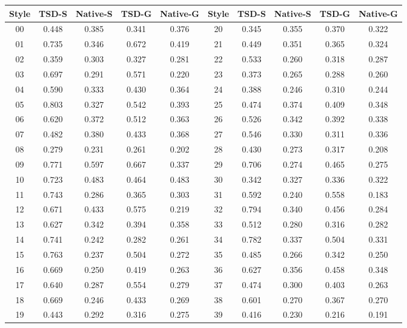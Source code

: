 \begin{tabular}{ccccc@{\hspace{14pt}}ccccc}
\toprule
Style & TSD-S & Native-S & TSD-G & Native-G & Style & TSD-S & Native-S & TSD-G & Native-G \\
\midrule
00 & 0.448 & 0.385 & 0.341 & 0.376 & 20 & 0.345 & 0.355 & 0.370 & 0.322 \\
01 & 0.735 & 0.346 & 0.672 & 0.419 & 21 & 0.449 & 0.351 & 0.365 & 0.324 \\
02 & 0.359 & 0.303 & 0.327 & 0.281 & 22 & 0.533 & 0.260 & 0.318 & 0.287 \\
03 & 0.697 & 0.291 & 0.571 & 0.220 & 23 & 0.373 & 0.265 & 0.288 & 0.260 \\
04 & 0.590 & 0.333 & 0.430 & 0.364 & 24 & 0.388 & 0.246 & 0.310 & 0.244 \\
05 & 0.803 & 0.327 & 0.542 & 0.393 & 25 & 0.474 & 0.374 & 0.409 & 0.348 \\
06 & 0.620 & 0.372 & 0.512 & 0.363 & 26 & 0.526 & 0.342 & 0.392 & 0.338 \\
07 & 0.482 & 0.380 & 0.433 & 0.368 & 27 & 0.546 & 0.330 & 0.311 & 0.336 \\
08 & 0.279 & 0.231 & 0.261 & 0.202 & 28 & 0.430 & 0.273 & 0.317 & 0.208 \\
09 & 0.771 & 0.597 & 0.667 & 0.337 & 29 & 0.706 & 0.274 & 0.465 & 0.275 \\
10 & 0.723 & 0.483 & 0.464 & 0.483 & 30 & 0.342 & 0.327 & 0.336 & 0.322 \\
11 & 0.743 & 0.286 & 0.365 & 0.303 & 31 & 0.592 & 0.240 & 0.558 & 0.183 \\
12 & 0.671 & 0.433 & 0.575 & 0.219 & 32 & 0.794 & 0.340 & 0.456 & 0.284 \\
13 & 0.627 & 0.342 & 0.394 & 0.358 & 33 & 0.512 & 0.280 & 0.316 & 0.282 \\
14 & 0.741 & 0.242 & 0.282 & 0.261 & 34 & 0.782 & 0.337 & 0.504 & 0.331 \\
15 & 0.763 & 0.237 & 0.504 & 0.272 & 35 & 0.485 & 0.266 & 0.342 & 0.250 \\
16 & 0.669 & 0.250 & 0.419 & 0.263 & 36 & 0.627 & 0.356 & 0.458 & 0.348 \\
17 & 0.640 & 0.287 & 0.554 & 0.279 & 37 & 0.474 & 0.300 & 0.403 & 0.263 \\
18 & 0.669 & 0.246 & 0.433 & 0.269 & 38 & 0.601 & 0.270 & 0.367 & 0.270 \\
19 & 0.443 & 0.292 & 0.316 & 0.275 & 39 & 0.416 & 0.230 & 0.216 & 0.191 \\
\bottomrule
\end{tabular}
